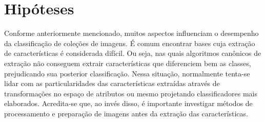 
%
%



\section{Hipóteses}

Conforme anteriormente mencionado, muitos aspectos influenciam o desempenho da classificação de coleções de imagens. É comum encontrar bases cuja extração de características é considerada difícil. Ou seja, nas quais algoritmos canônicos de extração não conseguem extrair características que diferenciem bem as classes, prejudicando sua posterior classificação. Nessa situação, normalmente tenta-se lidar com as particularidades das características extraídas através de transformações no espaço de atributos ou mesmo projetando classificadores mais elaborados. Acredita-se que, ao invés disso, é importante investigar métodos de processamento e preparação de imagens antes da extração das características.

